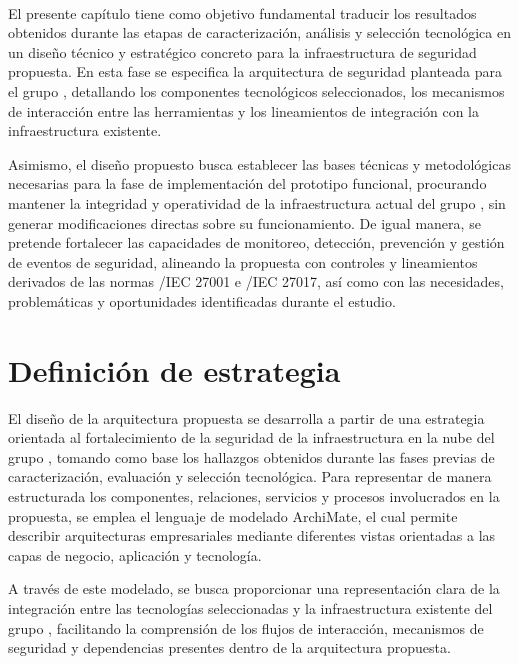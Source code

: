 \label{cap:disenio}
\mbox{}\\

El presente capítulo tiene como objetivo fundamental traducir los resultados obtenidos durante las etapas de caracterización, análisis y 
selección tecnológica en un diseño técnico y estratégico concreto para la infraestructura de seguridad propuesta. En esta fase se 
especifica la arquitectura de seguridad planteada para el grupo \GRID, detallando los componentes tecnológicos seleccionados, los 
mecanismos de interacción entre las herramientas y los lineamientos de integración con la infraestructura existente.

Asimismo, el diseño propuesto busca establecer las bases técnicas y metodológicas necesarias para la fase de implementación del prototipo 
funcional, procurando mantener la integridad y operatividad de la infraestructura actual del grupo \GRID, sin generar modificaciones 
directas sobre su funcionamiento. De igual manera, se pretende fortalecer las capacidades de monitoreo, detección, prevención y gestión de 
eventos de seguridad, alineando la propuesta con controles y lineamientos derivados de las normas \ISO/IEC 27001 e \ISO/IEC 27017, así como 
con las necesidades, problemáticas y oportunidades identificadas durante el estudio.

\section{Definición de estrategia}
\noindent

El diseño de la arquitectura propuesta se desarrolla a partir de una estrategia orientada al fortalecimiento de la seguridad de la 
infraestructura en la nube del grupo \GRID, tomando como base los hallazgos obtenidos durante las fases previas de caracterización, 
evaluación y selección tecnológica. Para representar de manera estructurada los componentes, relaciones, servicios y procesos involucrados 
en la propuesta, se emplea el lenguaje de modelado ArchiMate, el cual permite describir arquitecturas empresariales mediante diferentes 
vistas orientadas a las capas de negocio, aplicación y tecnología.

A través de este modelado, se busca proporcionar una representación clara de la integración entre las tecnologías seleccionadas y la 
infraestructura existente del grupo \GRID, facilitando la comprensión de los flujos de interacción, mecanismos de seguridad y dependencias 
presentes dentro de la arquitectura propuesta.

